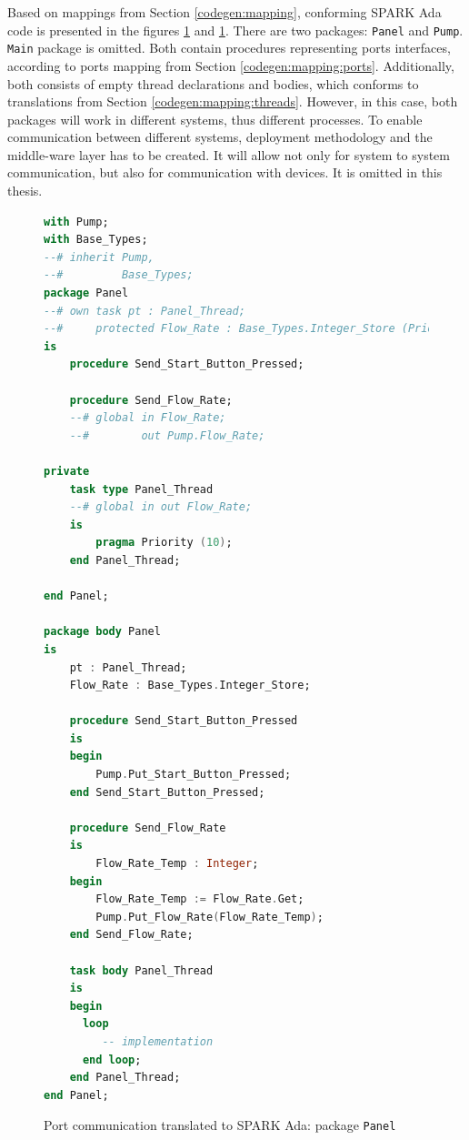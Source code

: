 Based on mappings from Section \ref{codegen:mapping}, conforming SPARK Ada code is presented in the figures \ref{listing:port_communication_spark_panel} and \ref{listing:port_communication_spark_panel}. There are two packages: \lstinline{Panel} and \lstinline{Pump}. \lstinline{Main} package is omitted. Both contain procedures representing ports interfaces, according to ports mapping from Section \ref{codegen:mapping:ports}. Additionally, both consists of empty thread declarations and bodies, which conforms to translations from Section \ref{codegen:mapping:threads}. However, in this case, both packages will work in different systems, thus different processes.  To enable communication between different systems, deployment methodology and the middle-ware layer has to be created. It will allow not only for system to system communication, but also for communication with devices. It is omitted in this thesis.

\begin{figure}
\singlespacing
\begin{lstlisting}[language=ada, frame=single, gobble=0]
with Pump;
with Base_Types;
--# inherit Pump,
--#         Base_Types;
package Panel
--# own task pt : Panel_Thread;
--#     protected Flow_Rate : Base_Types.Integer_Store (Priority => 10);
is
    procedure Send_Start_Button_Pressed;

    procedure Send_Flow_Rate;
    --# global in Flow_Rate;
    --#        out Pump.Flow_Rate;

private
    task type Panel_Thread
    --# global in out Flow_Rate;
    is
        pragma Priority (10);
    end Panel_Thread;

end Panel;

package body Panel
is
    pt : Panel_Thread;
    Flow_Rate : Base_Types.Integer_Store;

    procedure Send_Start_Button_Pressed
    is
    begin
        Pump.Put_Start_Button_Pressed;
    end Send_Start_Button_Pressed;

    procedure Send_Flow_Rate
    is
        Flow_Rate_Temp : Integer;
    begin
        Flow_Rate_Temp := Flow_Rate.Get;
        Pump.Put_Flow_Rate(Flow_Rate_Temp);
    end Send_Flow_Rate;

    task body Panel_Thread
    is
    begin
      loop
         -- implementation
      end loop;      
    end Panel_Thread;
end Panel;
\end{lstlisting} 
\doublespacing
\caption{Port communication translated to SPARK Ada: package \lstinline{Panel}}
\label{listing:port_communication_spark_panel}
\end{figure}

